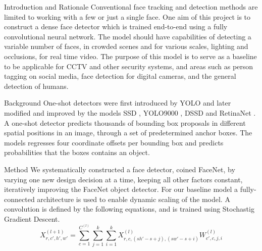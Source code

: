\documentclass[paperwidth=24in,paperheight=48in, fontscale=0.4166666666666]{baposter}
\begin{document}
\begin{poster}
\begin{posterbox}[name=intro,column=0,row=0]{Introduction and Rationale}
Conventional face tracking and detection methods are limited to working with a few or just a single face. One aim of this project is to construct a dense face detector which is trained end-to-end using a fully convolutional neural network. The model should have capabilities of detecting a variable number of faces, in crowded scenes and for various scales, lighting and occlusions, for real time video. The purpose of this model is to serve as a baseline to be applicable for CCTV and other security systems, and areas such as person tagging on social media, face detection for digital cameras, and the general detection of humans.
\end{posterbox}















\begin{posterbox}[name=background,column=0,below=intro]{Background}
One-shot detectors were first introduced by YOLO \cite{yolo} and later modified and improved by the models SSD \cite{ssd}, YOLO9000 \cite{yolo9000}, DSSD \cite{dssd} and RetinaNet \cite{retinanet}. A one-shot detector predicts thousands of bounding box proposals in different spatial positions in an image, through a set of predetermined anchor boxes. The models regresses four coordinate offsets per bounding box and predicts probabilities that the boxes contains an object.
\end{posterbox}















\begin{posterbox}[name=method,column=0,below=background]{Method}
We systematically constructed a face detector, coined FaceNet, by varying one new design decision at a time, keeping all other factors constant, iteratively improving the FaceNet object detector. For our baseline model a fully-connected architecture is used to enable dynamic scaling of the model. A convolution is defined by the following equations, and is trained using Stochastig Gradient Descent.
\begin{equation}\label{konvolution}
X^{(l+1)}_{r, c', h', w'} = \sum^{C^{(l)} }_{c=1} \sum^{k }_{j=1} \sum^{k }_{i=1} X^{(l)}_{r, c, (sh'-s+j), (sw'-s+i)}W^{(l)}_{c', c, j, i}
\end{equation}


\end{posterbox}
\end{poster}
\end{document}
